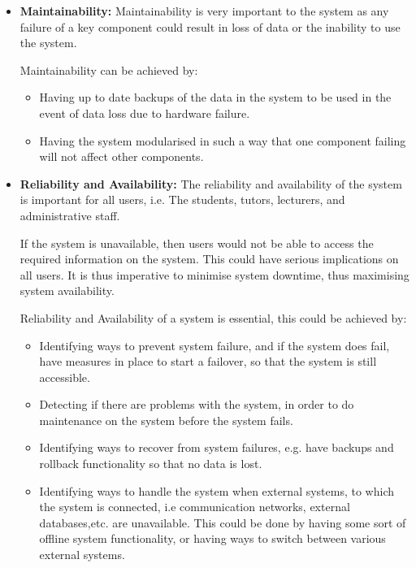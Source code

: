\begin{flushleft}
\begin{itemize}
\begin{itemize}
\end{itemize}
		\item \textbf{Maintainability:} 
Maintainability is very important to the system as any failure of a key component could result in loss of data or the inability to use the system.
\newline

Maintainability can be achieved by:
\begin{itemize}
\item Having up to date backups of the data in the system to be used in the event of data loss due to hardware failure.
\item Having the system modularised in such a way that one component failing will not affect other components.

\end{itemize}
		\item \textbf{Reliability and Availability:} 
The reliability and availability of the system is important for all users, i.e. The students, tutors, lecturers, and administrative staff.
\newline

If the system is unavailable, then users would not be able to access the required information on the system. This could have serious implications on all users. It is thus imperative to minimise system downtime, thus maximising system availability.\newline

Reliability and Availability of a system is essential, this could be achieved by:
\begin{itemize}
\item Identifying ways to prevent system failure, and if the system does fail, have measures in place to start a failover, so that the system is still accessible.
\item Detecting if there are problems with the system, in order to do maintenance on the system before the system fails.
\item Identifying ways to recover from system failures, e.g. have backups and rollback functionality so that no data is lost.
\item Identifying ways to handle the system when external systems, to which the system is connected, i.e communication networks, external databases,etc. are unavailable. This could be done by having some sort of offline system functionality, or having ways to switch between various external systems.
\end{itemize}


\end{itemize}
\end{flushleft}
